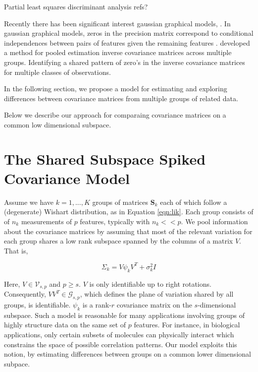 \documentclass{article}
\newcommand{\bl}[1]{{\mathbf #1}}
\begin{document}
Partial least squares discriminant analysis refs?
\citep{Westerhuis2008, Szymanska2012, Eriksson2001, Barker2003, Saebo2008}

Recently there has been significant interest gaussian graphical
models, .   In gaussian graphical models, zeros in the
precision matrix correspond to conditional independences between pairs
of features given the remaining features \citep{}.  \citet{Witten2014} developed a
method for pooled estimation inverse covariance matrices across
multiple groups.  Identifying a shared pattern of zero's in the inverse covariance
matrices for multiple classes of observations. 

In the following section, we
propose a model for estimating and exploring differences between
covariance matrices from multiple groups of related data.

Below we describe our approach for comparaing covariance matrices on
a common low dimensional subspace.

\section{The Shared Subspace Spiked Covariance Model}
\label{sec:shared}

Assume we have $k=1, ..., K$ groups of matrices $\bl S_k$ each of
which follow a (degenerate) Wishart distribution, as in Equation
\ref{eqn:lik}.  Each group consists of of $n_k$ measurements of $p$
features, typically with $n_k << p$.  We pool information about the
covariance matrices by assuming that most of the relevant variation
for each group shares a low rank subspace spanned by
the columns of a matrix $V$.  That is,

\begin{equation}
\Sigma_k = V\psi_kV^T + \sigma^2_kI
\label{eqn:sspsi}
\end{equation}

Here, $V \in \mathcal{V}_{s,p}$ and $p \geq s$.  $V$ is only
identifiable up to right rotations.  Consequently,
$VV^T \in \mathcal{G}_{s, p}$, which defines the plane of variation
shared by all groups, is identifiable.  $\psi_k$ is a rank-$r$
covariance matrix on the $s$-dimensional subspace.  Such a model is
reasonable for many applications involving groups of highly structure
data on the same set of $p$ features.  For instance, in biological
applications, only certain subsets of molecules can physically
interact which constrains the space of possible correlation patterns.
Our model exploits this notion, by estimating differences between
groups on a common lower dimensional subpace.
\end{document}
